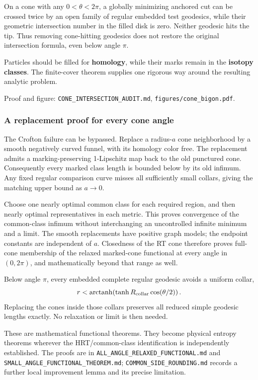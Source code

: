 \documentclass[11pt]{article}
\begin{document}
On a cone with any \(0<\theta<2\pi\), a globally minimizing anchored cut
can be crossed twice by an open family of regular embedded test
geodesics, while their geometric intersection number in the filled disk
is zero. Neither geodesic hits the tip. Thus removing cone-hitting
geodesics does not restore the original intersection formula, even below
angle \(\pi\).

Particles should be filled for \textbf{homology}, while their marks
remain in the \textbf{isotopy classes}. The finite-cover theorem
supplies one rigorous way around the resulting analytic problem.

Proof and figure: \texttt{CONE\_\allowbreak INTERSECTION\_\allowbreak AUDIT.md},
\texttt{figures/cone\_\allowbreak bigon.pdf}.

\subsubsection{A replacement proof for every cone
angle}\label{a-replacement-proof-for-every-cone-angle}

The Crofton failure can be bypassed. Replace a radius-\(a\) cone
neighborhood by a smooth negatively curved funnel, with its homology
color free. The replacement admits a marking-preserving 1-Lipschitz map
back to the old punctured cone. Consequently every marked class length
is bounded below by its old infimum. Any fixed regular comparison curve
misses all sufficiently small collars, giving the matching upper bound
as \(a\to0\).

Choose one nearly optimal common class for each required region, and
then nearly optimal representatives in each metric. This proves
convergence of the common-class infimum without interchanging an
uncontrolled infinite minimum and a limit. The smooth replacements have
positive graph models; the endpoint constants are independent of \(a\).
Closedness of the RT cone therefore proves full-cone membership of the
relaxed marked-cone functional at every angle in \((0,2\pi)\), and
mathematically beyond that range as well.

Below angle \(\pi\), every embedded complete regular geodesic avoids a
uniform collar, \[
r<\operatorname{arctanh}\!\left(\tanh R_{\rm collar}\cos(\theta/2)\right).
\] Replacing the cones inside those collars preserves all reduced simple
geodesic lengths exactly. No relaxation or limit is then needed.

These are mathematical functional theorems. They become physical entropy
theorems wherever the HRT/common-class identification is independently
established. The proofs are in
\texttt{ALL\_\allowbreak ANGLE\_\allowbreak RELAXED\_\allowbreak FUNCTIONAL.md} and
\texttt{SMALL\_\allowbreak ANGLE\_\allowbreak FUNCTIONAL\_\allowbreak THEOREM.md};
\texttt{COMMON\_\allowbreak SIDE\_\allowbreak ROUNDING.md} records a further local improvement
lemma and its precise limitation.
\end{document}

